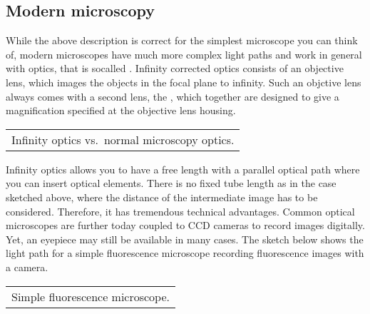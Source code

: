 \documentclass[letterpaper,10pt,english]{sphinxmanual}
\begin{document}
\subsection{Modern microscopy}
\label{\detokenize{notebooks/L6/Microscope:Modern-microscopy}}
While the above description is correct for the simplest microscope you can think of, modern microscopes have much more complex light paths and work in general with optics, that is so\sphinxhyphen{}called . Infinity corrected optics consists of an objective lens, which images the objects in the focal plane to infinity. Such an objctive lens always comes with a second lens, the , which together are designed to give a magnification specified at the objective lens housing.


\begin{savenotes}\sphinxattablestart
\centering
\begin{tabulary}{\linewidth}[t]{|T|}
\hline
\sphinxstyletheadfamily 
{}
\\
\hline
{} Infinity optics vs. normal microscopy optics.
\\
\hline
\end{tabulary}
\par
\sphinxattableend\end{savenotes}

Infinity optics allows you to have a free length with a parallel optical path where you can insert optical elements. There is no fixed tube length as in the case sketched above, where the distance of the intermediate image has to be considered. Therefore, it has tremendous technical advantages. Common optical microscopes are further today coupled to CCD cameras to record images digitally. Yet, an eye\sphinxhyphen{}piece may still be available in many cases. The sketch below shows the light path for a simple
fluorescence microscope recording fluorescence images with a camera.


\begin{savenotes}\sphinxattablestart
\centering
\begin{tabulary}{\linewidth}[t]{|T|}
\hline
\sphinxstyletheadfamily 
{}
\\
\hline
{} Simple fluorescence microscope.
\\
\hline
\end{tabulary}
\par
\sphinxattableend\end{savenotes}
\end{document}
